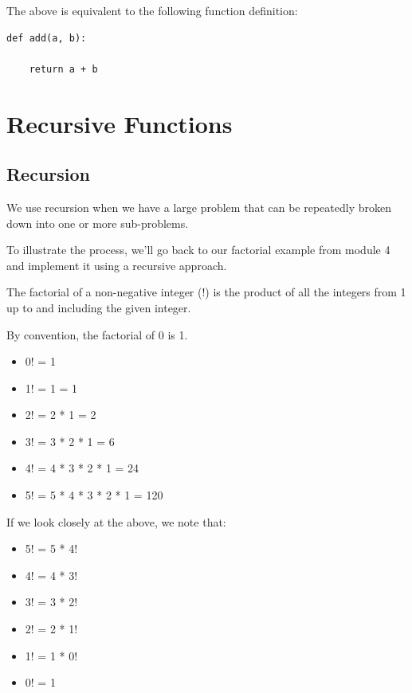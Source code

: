 \documentclass{article}
\begin{document}
The above is equivalent to the following function definition:

\begin{lstlisting}
def add(a, b):

    return a + b
\end{lstlisting}

\section{Recursive Functions}
\subsection{Recursion}

We use recursion when we have a large problem that can be repeatedly broken down into one or more sub-problems.  

To illustrate the process,  we'll go back to our factorial example from module 4 and implement it using a recursive approach.

The factorial of a non-negative integer (!) is the product of all the integers from 1 up to and including the given integer.

By convention, the factorial of 0 is 1.

\begin{itemize}

\item 0! = 1

\item 1! = 1 = 1

\item 2! = 2 * 1 = 2

\item 3! = 3 * 2 * 1 = 6

\item 4! = 4 * 3 * 2 * 1 = 24

\item 5! = 5 * 4 * 3 * 2 * 1 = 120
\end{itemize}

If we look closely at the above, we note that:
\begin{itemize}

\item 5! = 5 * 4!

\item 4!  = 4 * 3!

\item 3! = 3 * 2!

\item 2! = 2 * 1!

\item 1! = 1 * 0!

\item 0! = 1
\end{itemize}
\end{document}

